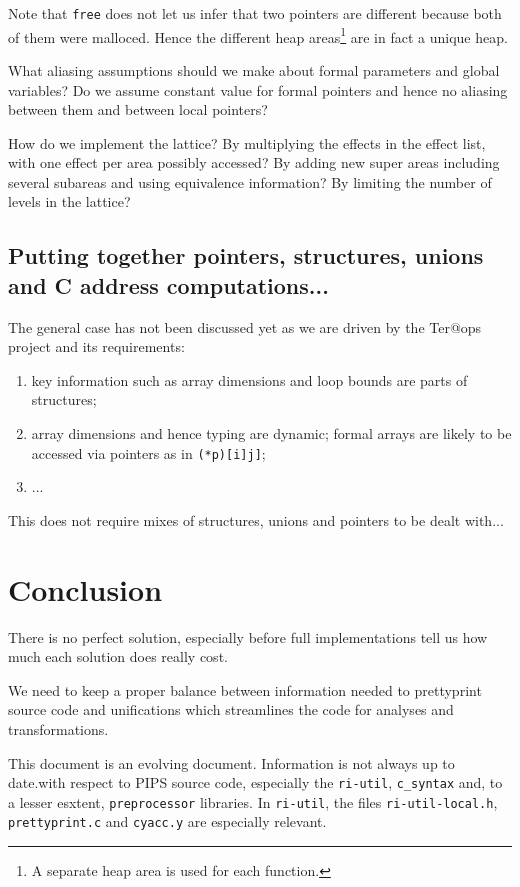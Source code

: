 \documentclass[a4paper]{report}
\begin{document}
Note that \verb/free/ does not let us infer that two pointers are
 different because both of them were malloced. Hence the different
 heap areas\footnote{A separate heap area is used for each function.}
 are in fact a unique heap.

What aliasing assumptions should we make about formal parameters and
 global variables? Do we assume constant value for formal pointers and
 hence no aliasing between them and between local pointers?

How do we implement the lattice? By multiplying the effects in the
 effect list, with one effect per area possibly accessed? By adding
 new super areas including several subareas and using equivalence
 information? By limiting the number of levels in the lattice?

\section{Putting together pointers, structures, unions and C address computations...}

The general case has not been discussed yet as we are driven by the
 Ter@ops project and its requirements:
\begin{enumerate}
\item key information such as array dimensions and loop bounds are
 parts of structures;
\item array dimensions and hence typing are dynamic; formal arrays are
 likely to be accessed via pointers as in \verb/(*p)[i]j]/;
\item ...
\end{enumerate}

This does not require mixes of structures, unions and pointers to be
 dealt with...

\chapter*{Conclusion}

There is no perfect solution, especially before full implementations
tell us how much each solution does really cost.

We need to keep a proper balance between information needed to
prettyprint source code and unifications which streamlines the code
for analyses and transformations.

This document is an evolving document. Information is not always up to
date.with respect to PIPS source code, especially the \verb/ri-util/,
\verb/c_syntax/ and, to a lesser esxtent, \verb/preprocessor/
libraries. In \verb/ri-util/, the files \verb/ri-util-local.h/,
\verb/prettyprint.c/ and \verb/cyacc.y/ are especially relevant.
\end{document}
